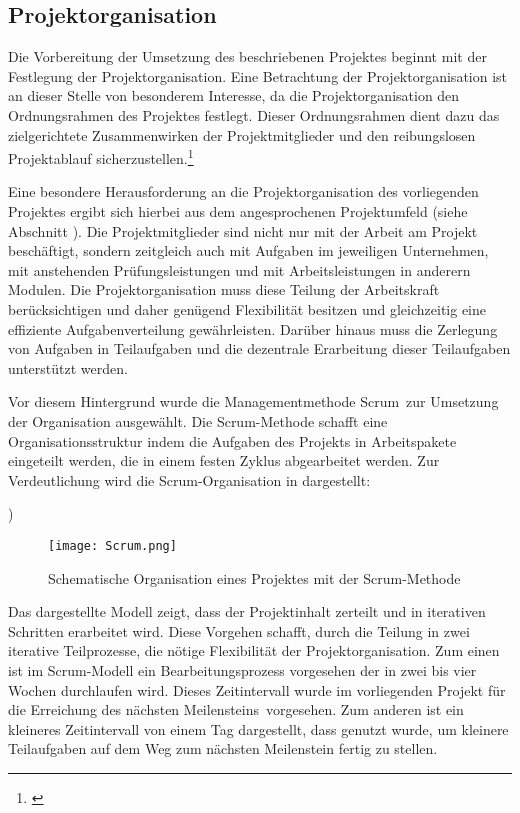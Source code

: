 \subsection{Projektorganisation}
\label{sec:Projektorganisation}

Die Vorbereitung der Umsetzung des beschriebenen Projektes beginnt mit der Festlegung der Projektorganisation.
Eine Betrachtung der Projektorganisation ist an dieser Stelle von besonderem Interesse, da die Projektorganisation
den Ordnungsrahmen des Projektes festlegt.
Dieser Ordnungsrahmen dient dazu das zielgerichtete Zusammenwirken
der Projektmitglieder und den reibungslosen Projektablauf sicherzustellen.\footnote{\citet[S.~15]{geiger2009}}

Eine besondere Herausforderung an die Projektorganisation des vorliegenden Projektes ergibt sich hierbei
aus dem angesprochenen Projektumfeld (siehe Abschnitt ). Die Projektmitglieder sind
nicht nur mit der Arbeit am Projekt beschäftigt, sondern zeitgleich auch mit Aufgaben im jeweiligen
Unternehmen, mit anstehenden Prüfungsleistungen und mit Arbeitsleistungen in anderern Modulen.
Die Projektorganisation muss diese Teilung der Arbeitskraft berücksichtigen und daher genügend Flexibilität
besitzen und gleichzeitig eine effiziente Aufgabenverteilung gewährleisten. Darüber hinaus muss
die Zerlegung von Aufgaben in Teilaufgaben und die dezentrale Erarbeitung dieser Teilaufgaben unterstützt werden.

Vor diesem Hintergrund wurde die Managementmethode Scrum\footnotemark\ zur Umsetzung der Organisation ausgewählt.
Die Scrum-Methode schafft eine Organisationsstruktur indem die Aufgaben des Projekts in Arbeitspakete eingeteilt werden,
die in einem festen Zyklus abgearbeitet werden. Zur Verdeutlichung wird die Scrum-Organisation in 
dargestellt:

)

\begin{figure}[htb] 
\centering
\texttt{[image: Scrum.png]}
\caption[Scrum-Organisation]{Schematische Organisation eines Projektes mit der Scrum-Methode\protect\footnotemark}
\label{fig:Scrum}
\end{figure}

Das dargestellte Modell zeigt, dass der Projektinhalt zerteilt und in iterativen Schritten erarbeitet wird. Diese
Vorgehen schafft, durch die Teilung in zwei iterative Teilprozesse, die nötige Flexibilität der Projektorganisation.
Zum einen ist im Scrum-Modell ein Bearbeitungsprozess vorgesehen
der in zwei bis vier Wochen durchlaufen wird. Dieses Zeitintervall wurde im vorliegenden Projekt für die Erreichung des
nächsten Meilensteins\footnotemark\ vorgesehen. Zum anderen ist ein kleineres Zeitintervall von einem Tag dargestellt, dass
genutzt wurde, um kleinere Teilaufgaben auf dem Weg zum nächsten Meilenstein fertig zu stellen.

